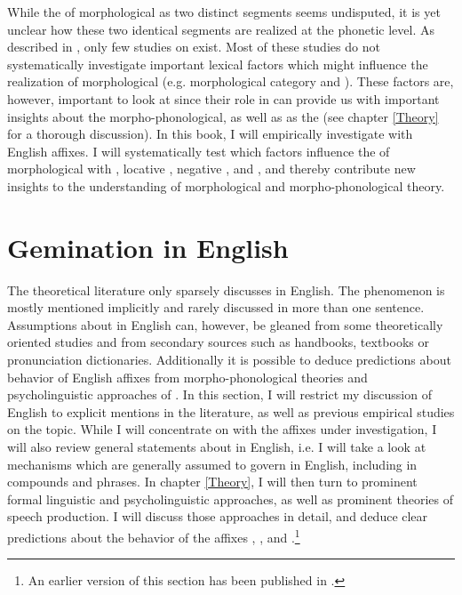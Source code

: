While the  of morphological  as two distinct segments seems undisputed, it is yet unclear how these two identical segments are realized at the phonetic level. As described in , only few studies on  exist. Most of these studies do not systematically investigate important lexical factors which might influence the realization of morphological  (e.g. morphological category and ). These factors are, however, important to look at since their role in  can provide us with important insights about the morpho-phonological, as well as as the  (see chapter \ref{Theory} for a thorough discussion). 
In this book, I will empirically investigate  with English affixes. I will systematically test which factors influence the  of morphological  with , locative , negative ,  and , and thereby contribute new insights to the understanding of morphological  and morpho-phonological theory.


\section{Gemination in English} \label{Gemination in English}

The theoretical literature only sparsely discusses  in English. The phenomenon is mostly mentioned implicitly and rarely discussed in more than one sentence.  Assumptions about  in English can, however, be gleaned from some  theoretically oriented studies and from secondary sources such as handbooks, textbooks or pronunciation dictionaries. Additionally it is possible to deduce predictions about  behavior of English affixes from morpho-phonological theories and psycholinguistic approaches of . In this section, I will restrict my discussion of English  to explicit mentions in the literature, as well as previous empirical studies on the topic. While I will concentrate on  with the affixes under investigation, I will also review general statements about  in English, i.e. I will take a look at mechanisms which are generally assumed to govern  in English, including  in compounds and phrases.
In chapter \ref{Theory}, I will then turn to prominent formal linguistic and psycholinguistic approaches, as well as prominent theories of speech production. I will discuss those approaches in detail, and deduce clear predictions about the  behavior of the affixes , ,  and .\footnote{An earlier version of this section has been published in \cite{BenHedia.2017}.}
\label{assumptions}
 

